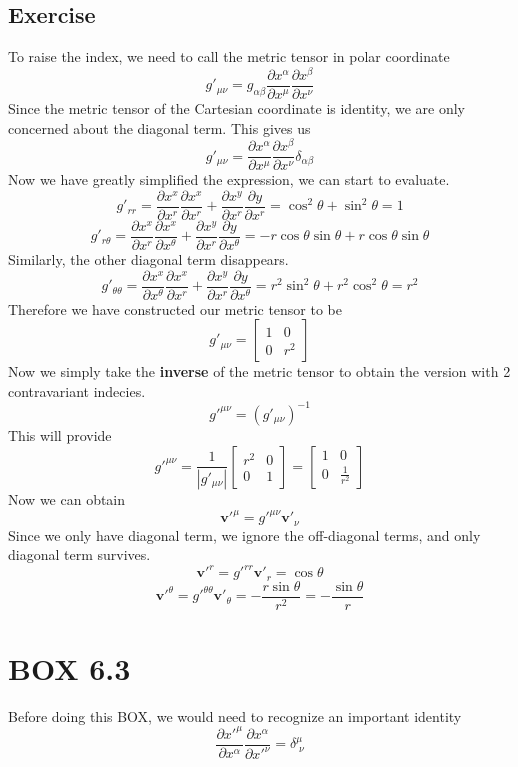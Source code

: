 \documentclass[12pt]{memoir}
\newcommand{\pypx}[2]{\frac{\partial #1}{\partial #2}}
\newcommand{\paren}[1]{\left( #1 \right)}
\newcommand{\abso}[1]{\left|#1 \right|}
\begin{document}
    \subsection{Exercise}
    To raise the index, we need to call the metric tensor in polar coordinate
    \[
    g'_{\mu\nu} = g_{\alpha\beta}\pypx{x^\alpha}{x^\mu}\pypx{x^\beta}{x^\nu}
    \]
    Since the metric tensor of the Cartesian coordinate is identity, we are only concerned about the diagonal term. This gives us
    \[
    g'_{\mu\nu} = \pypx{x^\alpha}{x^\mu}\pypx{x^\beta}{x^\nu}\delta_{\alpha\beta}
    \]
    Now we have greatly simplified the expression, we can start to evaluate.
    \[
    g'_{rr} = \pypx{x^x}{x^r}\pypx{x^x}{x^r} + \pypx{x^y}{x^r}\pypx{y}{x^r} = \cos^2\theta+\sin^2\theta = 1
    \]
    \[
    g'_{r\theta} = \pypx{x^x}{x^r}\pypx{x^x}{x^\theta} + \pypx{x^y}{x^r}\pypx{y}{x^\theta} = -r\cos\theta\sin\theta + r\cos\theta\sin\theta
    \]
    Similarly, the other diagonal term disappears. 
    \[
    g'_{\theta\theta} = \pypx{x^x}{x^\theta}\pypx{x^x}{x^r} + \pypx{x^y}{x^r}\pypx{y}{x^\theta} = r^2\sin^2\theta + r^2\cos^2\theta = r^2
    \]
    Therefore we have constructed our metric tensor to be
    \[
    g'_{\mu\nu} = \begin{bmatrix}
        1&0\\
        0&r^2
    \end{bmatrix}
    \]
    Now we simply take the \textbf{inverse} of the metric tensor to obtain the version with 2 contravariant indecies.
    \[
    g'^{\mu\nu} = \paren{g'_{\mu\nu}}^{-1}
    \]
    This will provide
    \[
    g'^{\mu\nu} = \frac{1}{\abso{g'_{\mu\nu}}}\begin{bmatrix}
        r^2&0\\
        0&1
    \end{bmatrix} = \begin{bmatrix}
        1&0\\
        0&\frac{1}{r^2}
    \end{bmatrix}
    \]
    Now we can obtain
    \[
    \mathbf{v}'^{\mu} = g'^{\mu\nu}\mathbf{v}'_\nu
    \]
    Since we only have diagonal term, we ignore the off-diagonal terms, and only diagonal term survives. 
    \[
    \mathbf{v}'^{r} = g'^{rr}\mathbf{v}'_r = \cos\theta
    \]
    \[
    \mathbf{v}'^{\theta} = g'^{\theta\theta}\mathbf{v}'_{\theta} = -\frac{r\sin\theta}{r^2} = -\frac{\sin\theta}{r}
    \]

\section{BOX 6.3}
Before doing this BOX, we would need to recognize an important identity
\[
\pypx{x'^\mu}{x^\alpha}\pypx{x^\alpha}{x'^\nu} = \delta^{\mu}_{\;\nu}
\]
\end{document}
